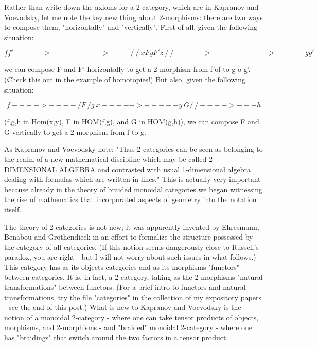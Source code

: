 Rather than write down the axioms for a 2-category, which are in
Kapranov and Voevodsky, let me note the key new thing about 2-morphisms:
there are two ways to compose them, "horizontally" and "vertically".
First of all, given the following situation:

$$
                      f           f'
                  ---->---    ---->---
                 /         \ /         \
                x     F     y     F'    z
                 \         / \         /
                  ---->----   ---->----
                      g           g'
$$
    

we can compose F and F' horizontally to get a 2-morphism from  f'of  to
g o g'.  (Check this out in the example of homotopies!)  But also, given
the following situation:

$$
                          f
                      ---->----
                     /  F      \
                    /     g     \
                   x ----->----- y
                    \   G       /
                     \         /
                      ---->---
                          h
$$
    

(f,g,h in Hom(x,y), F in HOM(f,g), and G in HOM(g,h)), we can
compose F and G vertically to get a 2-morphism from f to g.  

As Kapranov and Voevodsky note: "Thus 2-categories can be seen as
belonging to the realm of a new mathematical discipline which may be
called 2-DIMENSIONAL ALGEBRA and contrasted with usual 1-dimensional
algebra dealing with formulas which are written in lines."  This is
actually very important because already in the theory of braided
monoidal categories we began witnessing the rise of mathematics that
incorporated aspects of geometry into the notation itself. 

The theory of 2-categories is not new; it was apparently invented by
Ehresmann, Benabou and Grothendieck in an effort to formalize the
structure possessed by the category of all categories.  (If this notion
seems dangerously close to Russell's paradox, you are right - but I will
not worry about such issues in what follows.)  This category has as its
objects categories and as its morphisms "functors" between categories.  It
is, in fact, a 2-category, taking as the 2-morphisms "natural
transformations" between functors.  (For a brief intro to functors and
natural transformations, try the file "categories" in the collection of
my expository papers - see the end of this post.)  What is new to
Kapranov and Voevodsky is the notion of a monoidal 2-category -
where one can take tensor products of objects, morphisms, and
2-morphisms - and "braided" monoidal 2-category - where one has
"braidings" that switch around the two factors in a tensor product.  

